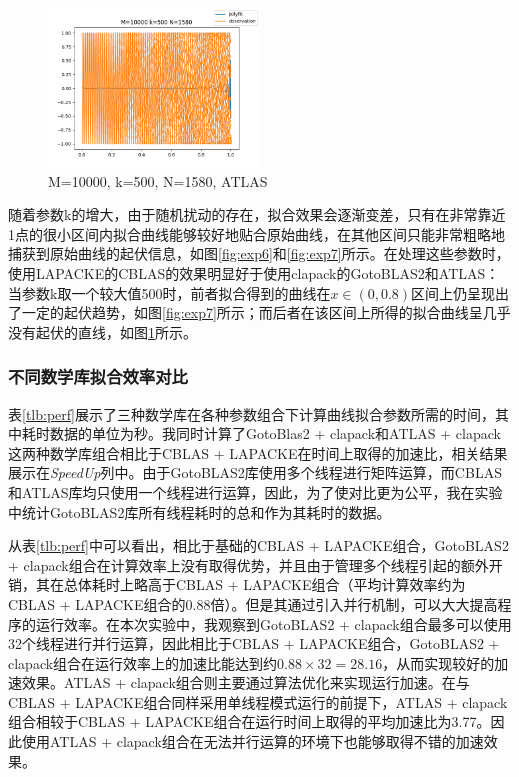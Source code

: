\documentclass[a4paper]{article}
\begin{document}
\begin{figure}[tbp]
  \centering
  \includegraphics[width=0.5\textwidth]{figures/atlas/figure31_M_10000_k_500_N_1580.png}
  \caption{M=10000, k=500, N=1580, ATLAS}
  \label{fig:exp8}
\end{figure}

随着参数k的增大，由于随机扰动的存在，拟合效果会逐渐变差，只有在非常靠近1点的很小区间内拟合曲线能够较好地贴合原始曲线，在其他区间只能非常粗略地捕获到原始曲线的起伏信息，如图\ref{fig:exp6}和\ref{fig:exp7}所示。在处理这些参数时，使用LAPACKE的CBLAS的效果明显好于使用clapack的GotoBLAS2和ATLAS：当参数k取一个较大值500时，前者拟合得到的曲线在$x \in (0, 0.8)$区间上仍呈现出了一定的起伏趋势，如图\ref{fig:exp7}所示；而后者在该区间上所得的拟合曲线呈几乎没有起伏的直线，如图\ref{fig:exp8}所示。






\subsubsection{不同数学库拟合效率对比}
表\ref{tlb:perf}展示了三种数学库在各种参数组合下计算曲线拟合参数所需的时间，其中耗时数据的单位为秒。我同时计算了GotoBlas2 + clapack和ATLAS + clapack这两种数学库组合相比于CBLAS + LAPACKE在时间上取得的加速比，相关结果展示在\emph{SpeedUp}列中。由于GotoBLAS2库使用多个线程进行矩阵运算，而CBLAS和ATLAS库均只使用一个线程进行运算，因此，为了使对比更为公平，我在实验中统计GotoBLAS2库所有线程耗时的总和作为其耗时的数据。

从表\ref{tlb:perf}中可以看出，相比于基础的CBLAS + LAPACKE组合，GotoBLAS2 + clapack组合在计算效率上没有取得优势，并且由于管理多个线程引起的额外开销，其在总体耗时上略高于CBLAS + LAPACKE组合（平均计算效率约为CBLAS + LAPACKE组合的0.88倍）。但是其通过引入并行机制，可以大大提高程序的运行效率。在本次实验中，我观察到GotoBLAS2 + clapack组合最多可以使用32个线程进行并行运算，因此相比于CBLAS + LAPACKE组合，GotoBLAS2 + clapack组合在运行效率上的加速比能达到约$0.88\times 32=28.16$，从而实现较好的加速效果。ATLAS + clapack组合则主要通过算法优化来实现运行加速。在与CBLAS + LAPACKE组合同样采用单线程模式运行的前提下，ATLAS + clapack组合相较于CBLAS + LAPACKE组合在运行时间上取得的平均加速比为3.77。因此使用ATLAS + clapack组合在无法并行运算的环境下也能够取得不错的加速效果。
\end{document}

